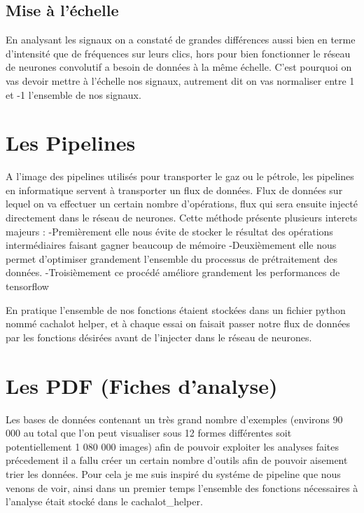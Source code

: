\hypertarget{Mise-a-l-echelle}{%
\subsection{Mise à l'échelle}
\label{Mise-a-l-echelle}}

En analysant les signaux on a constaté de grandes différences aussi bien en terme d'intensité que de fréquences sur leurs clics, hors pour bien fonctionner le réseau de neurones convolutif a besoin de données à la même échelle. C'est pourquoi on vas devoir mettre à l'échelle nos signaux, autrement dit on vas normaliser entre 1 et -1 l'ensemble de nos signaux.

\hypertarget{Les-Pipelines}{%
\section{Les Pipelines}
\label{Les-Pipelines}}

A l'image des pipelines utilisés pour transporter le gaz ou le pétrole, les pipelines en informatique servent à transporter un flux de données.
Flux de données sur lequel on va effectuer un certain nombre d'opérations, flux qui sera ensuite injecté directement dans le réseau de neurones.
Cette méthode présente plusieurs interets majeurs :
-Premièrement elle nous évite de stocker le résultat des opérations intermédiaires  faisant gagner beaucoup de mémoire
-Deuxièmement elle nous permet d'optimiser grandement l'ensemble du processus de prétraitement des données.
-Troisièmement ce procédé améliore grandement les performances de tensorflow

En pratique l'ensemble de nos fonctions étaient stockées dans un fichier python nommé cachalot helper, et à chaque essai on faisait passer notre flux de données par les fonctions désirées avant de l'injecter dans le réseau de neurones.


\hypertarget{Les-PDF}{%
\section{Les PDF (Fiches d'analyse)}
\label{Les-PDF}}

Les bases de données contenant un très grand nombre d'exemples (environs 90 000 au total que l'on peut visualiser sous 12 formes différentes soit potentiellement 1 080 000 images) afin de pouvoir exploiter les analyses faites précedement il a fallu créer un certain nombre d'outils afin de pouvoir aisement trier les données.
Pour cela je me suis inspiré du systéme de pipeline que nous venons de voir, ainsi dans un premier temps l'ensemble des fonctions nécessaires à l'analyse était stocké dans le cachalot{\_}helper.

